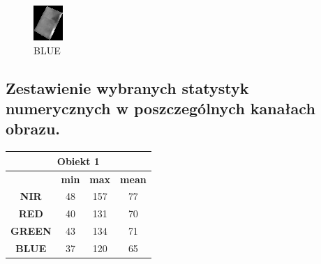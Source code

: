 \documentclass[a4paper,12pt]{article}  %
\begin{document}
\begin{figure}[H]
\begin{minipage}{0.24\textwidth}
        \includegraphics[width=\linewidth]{spektralne/blue_budynek3.png}
        \caption*{BLUE}
    \end{minipage}
\end{figure}

\newpage
\subsection{Zestawienie wybranych statystyk numerycznych w poszczególnych kanałach obrazu.}

\begin{table}[h!]
\centering
\begin{tabular}{|c|c|c|c|}
\hline
\multicolumn{4}{|c|}{\textbf{Obiekt 1}} \\ \hline
\textbf{} & \textbf{min} & \textbf{max} & \textbf{mean} \\ \hline
\textbf{NIR} & 48 & 157 & 77\\ \hline
\textbf{RED} & 40 & 131 & 70\\ \hline
\textbf{GREEN} & 43 & 134 & 71\\ \hline
\textbf{BLUE} & 37 & 120 & 65\\ \hline
\end{tabular}
\end{table}
\end{document}
